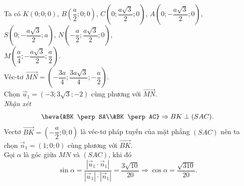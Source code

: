 \begin{ex}
{\begin{center}
		\end{center}
		Ta có 
		$K(0;0;0)$, $B\left(\dfrac{a}{2};0;0\right)$, $C\left(0;\dfrac{a\sqrt{3}}{2};0\right)$, $A\left(0;-\dfrac{a\sqrt{3}}{2};0\right)$, 
		 $S\left(0;-\dfrac{a\sqrt{3}}{2};a\right)$, $N\left(-\dfrac{a}{2};\dfrac{a\sqrt{3}}{2};0\right)$,\\ $M\left(\dfrac{a}{4};-\dfrac{a\sqrt{3}}{2};\dfrac{a}{2}\right)$.\\
		Véc-tơ $\overrightarrow{MN} = \left(-\dfrac{3a}{4}; \dfrac{3a\sqrt{3}}{4}; -\dfrac{a}{2}\right)$.\\ 
		Chọn $\overrightarrow{u}_1 = (-3; 3\sqrt{3};  -2)$ cùng phương với $\overrightarrow{MN}$.\\
		\textit{Nhận  xét}
		 $$\heva{&BK \perp SA\\&BK \perp AC}\Rightarrow BK \perp (SAC).$$
		Vectơ  $\overrightarrow{BK} = \left(-\dfrac{a}{2}; 0; 0\right)$ là véc-tơ pháp tuyến của mặt phẳng $(SAC)$ nên ta chọn $\overrightarrow{n}_1 = (1;0;0)$ cùng phương với $\overrightarrow{BK}$.\\
		Gọi $\alpha$ là góc giữa $MN$ và $(SAC)$, khi đó 
		 $$
		\sin\alpha = \dfrac{\left|\overrightarrow{u}_1 \cdot \overrightarrow{n}_1\right|}{\left|\overrightarrow{u}_1\right| \cdot  \left|\overrightarrow{n}_1\right|} = \dfrac{3\sqrt{10}}{20} \Rightarrow \cos\alpha = \dfrac{\sqrt{310}}{20}.
		 $$
	} 
\end{ex}

